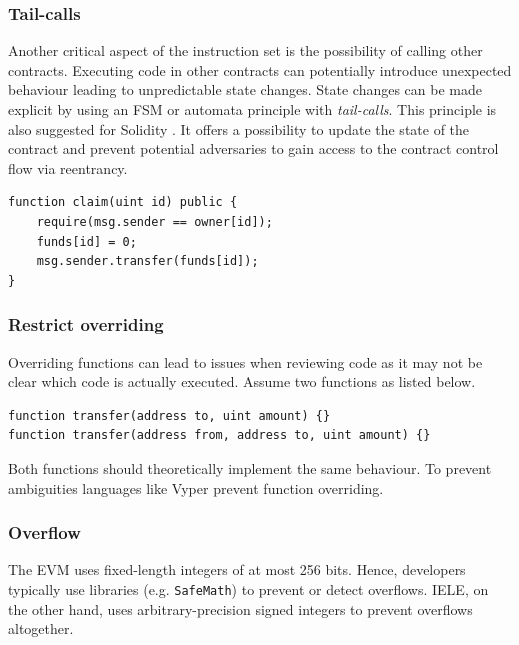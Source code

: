 \subsubsection{Tail-calls}
Another critical aspect of the instruction set is the possibility of calling other contracts. Executing code in other contracts can potentially introduce unexpected behaviour leading to unpredictable state changes. State changes can be made explicit by using an FSM or automata principle with \emph{tail-calls}. This principle is also suggested for Solidity \cite{ConsenSys2018Security}.
It offers a possibility to update the state of the contract and prevent potential adversaries to gain access to the contract control flow via reentrancy.

\begin{lstlisting}[caption={Tail calls implemented in Solidity.},label=lst:tail-call,language=Solidity]
function claim(uint id) public {
    require(msg.sender == owner[id]);
    funds[id] = 0;
    msg.sender.transfer(funds[id]);
}
\end{lstlisting}



\subsubsection{Restrict overriding}
Overriding functions can lead to issues when reviewing code as it may not be clear which code is actually executed. Assume two functions as listed below.
\begin{lstlisting}[caption={Function overriding with different inputs.},label=lst:tail-call,language=Solidity]
function transfer(address to, uint amount) {}
function transfer(address from, address to, uint amount) {}
\end{lstlisting}
Both functions should theoretically implement the same behaviour. To prevent ambiguities languages like Vyper prevent function overriding.

\subsubsection{Overflow}
The EVM uses fixed-length integers of at most 256 bits.
Hence, developers typically use libraries (e.g. \texttt{SafeMath}) to prevent or detect overflows.
IELE, on the other hand, uses arbitrary-precision signed integers to prevent overflows altogether.

